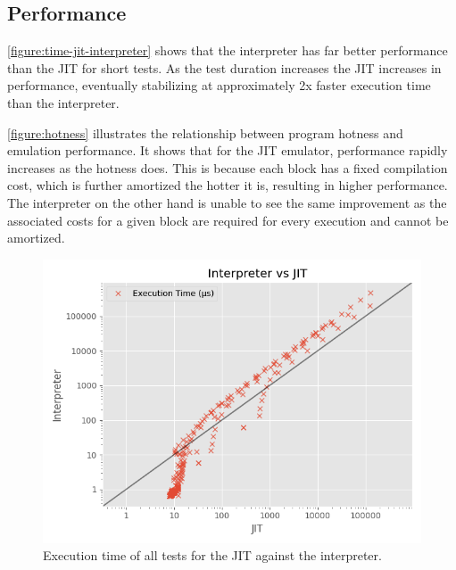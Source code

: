 \subsection{Performance}






\autoref{figure:time-jit-interpreter} shows that the interpreter has far better performance than the JIT for short tests. As the test duration increases the JIT increases in performance, eventually stabilizing at approximately 2x faster execution time than the interpreter.

\autoref{figure:hotness} illustrates the relationship between program hotness and emulation performance. It shows that for the JIT emulator, performance rapidly increases as the hotness does. This is because each block has a fixed compilation cost, which is further amortized the hotter it is, resulting in higher performance. The interpreter on the other hand is unable to see the same improvement as the associated costs for a given block are required for every execution and cannot be amortized.

\begin{figure}[h]
    \centering
    \includegraphics[scale=0.75]{output/graphs/scatter/JIT-vs-Interpreter-time.png}
    \caption{Execution time of all tests for the JIT against the interpreter.}
    \label{figure:time-jit-interpreter}
\end{figure}

